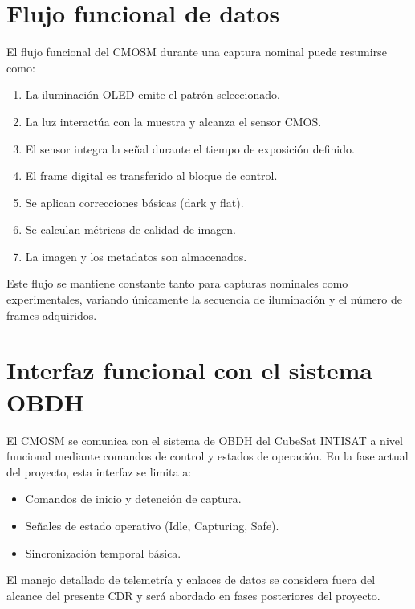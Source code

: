 \section{Flujo funcional de datos}

El flujo funcional del CMOSM durante una captura nominal puede resumirse como:

\begin{enumerate}
    \item La iluminación OLED emite el patrón seleccionado.
    \item La luz interactúa con la muestra y alcanza el sensor CMOS.
    \item El sensor integra la señal durante el tiempo de exposición definido.
    \item El frame digital es transferido al bloque de control.
    \item Se aplican correcciones básicas (dark y flat).
    \item Se calculan métricas de calidad de imagen.
    \item La imagen y los metadatos son almacenados.
\end{enumerate}

Este flujo se mantiene constante tanto para capturas nominales como
experimentales, variando únicamente la secuencia de iluminación y el número de
frames adquiridos.

\section{Interfaz funcional con el sistema OBDH}

El CMOSM se comunica con el sistema de OBDH del CubeSat INTISAT a nivel funcional
mediante comandos de control y estados de operación. En la fase actual del
proyecto, esta interfaz se limita a:

\begin{itemize}
    \item Comandos de inicio y detención de captura.
    \item Señales de estado operativo (Idle, Capturing, Safe).
    \item Sincronización temporal básica.
\end{itemize}

El manejo detallado de telemetría y enlaces de datos se considera fuera del
alcance del presente CDR y será abordado en fases posteriores del proyecto.

